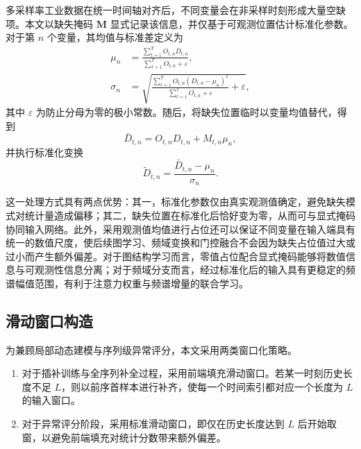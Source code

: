 多采样率工业数据在统一时间轴对齐后，不同变量会在非采样时刻形成大量空缺项。本文以缺失掩码 $\mathbf{M}$ 显式记录该信息，并仅基于可观测位置估计标准化参数。对于第 $n$ 个变量，其均值与标准差定义为
\begin{align}
    \mu_n &= \frac{\sum_{t=1}^{T} O_{t,n} D_{t,n}}{\sum_{t=1}^{T} O_{t,n} + \varepsilon}, \\
    \sigma_n &= \sqrt{\frac{\sum_{t=1}^{T} O_{t,n}(D_{t,n}-\mu_n)^2}{\sum_{t=1}^{T} O_{t,n} + \varepsilon} + \varepsilon},
\end{align}
其中 $\varepsilon$ 为防止分母为零的极小常数。随后，将缺失位置临时以变量均值替代，得到
\begin{equation}
    \bar{D}_{t,n} = O_{t,n} D_{t,n} + M_{t,n} \mu_n,
\end{equation}
并执行标准化变换
\begin{equation}
    \tilde{D}_{t,n} = \frac{\bar{D}_{t,n}-\mu_n}{\sigma_n}.
\end{equation}

这一处理方式具有两点优势：其一，标准化参数仅由真实观测值确定，避免缺失模式对统计量造成偏移；其二，缺失位置在标准化后恰好变为零，从而可与显式掩码协同输入网络。此外，采用观测值均值进行占位还可以保证不同变量在输入端具有统一的数值尺度，使后续图学习、频域变换和门控融合不会因为缺失占位值过大或过小而产生额外偏差。对于图结构学习而言，零值占位配合显式掩码能够将数值信息与可观测性信息分离；对于频域分支而言，经过标准化后的输入具有更稳定的频谱幅值范围，有利于注意力权重与频谱增量的联合学习。

\subsection{滑动窗口构造}

为兼顾局部动态建模与序列级异常评分，本文采用两类窗口化策略。

\begin{enumerate}
    \item 对于插补训练与全序列补全过程，采用前端填充滑动窗口。若某一时刻历史长度不足 $L$，则以前序首样本进行补齐，使每一个时间索引都对应一个长度为 $L$ 的输入窗口。
    \item 对于异常评分阶段，采用标准滑动窗口，即仅在历史长度达到 $L$ 后开始取窗，以避免前端填充对统计分数带来额外偏差。
\end{enumerate}

